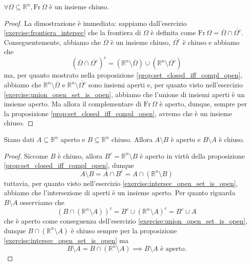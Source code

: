 \begin{lemma}
    $\forall \Omega \subseteq \mathbb{R}^n, \text{Fr} \, \Omega$ è un insieme chiuso.
    \label{lemma:frontiera_chiusa}
\end{lemma}
\begin{proof}
    La dimostrazione è immediata: sappiamo dall'esercizio \ref{exercise:frontiera_intersec} che la frontiera di $\Omega$ è definita come $\text{Fr} \, \Omega = \overline{\Omega} \cap \overline{\Omega^c}$. Conseguentemente,
    abbiamo che $\overline{\Omega}$ è un insieme chiuso, $\overline{\Omega^c}$ è chiuso e abbiamo che
    $$
        (\overline{\Omega} \cap \overline{\Omega^c})^c = (\mathbb{R}^n \setminus \overline{\Omega}) \cup (\mathbb{R}^n \setminus \overline{\Omega^c})
    $$
    ma, per quanto mostrato nella proposizione \ref{prop:set_closed_iff_compl_open}, abbiamo che $\mathbb{R}^n \setminus \overline{\Omega}$ e $\mathbb{R}^n \setminus \overline{\Omega^c}$ sono insiemi aperti e, per quanto visto nell'esercizio \ref{exercise:union_open_set_is_open}, abbiamo che
    l'unione di insiemi aperti è un insieme aperto. Ma allora il complementare di $\text{Fr} \, \Omega$ è aperto, dunque, sempre per la proposizione \ref{prop:set_closed_iff_compl_open}, avremo che è un insieme chiuso.
\end{proof}
\begin{lemma}
    Siano dati $A \subseteq \mathbb{R}^n$ aperto e $B \subseteq \mathbb{R}^n$ chiuso. Allora $A \setminus B$ è aperto e $B \setminus A$ è chiuso.
    \label{lemma:diff_open_closed_set}
\end{lemma}
\begin{proof}
    Siccome $B$ è chiuso, allora $B^c = \mathbb{R}^n \setminus B$ è aperto in virtù della proposizione \ref{prop:set_closed_iff_compl_open}, dunque 
    $$
    A \setminus B = A \cap B^c = A \cap (\mathbb{R}^n \setminus B)
    $$
    tuttavia, per quanto visto nell'esercizio \ref{exercise:intersec_open_set_is_open}, abbiamo che l'intersezione di aperti è un insieme aperto. Per quanto riguarda $B \setminus A$ osserviamo che
    $$
    (B \cap (\mathbb{R}^n \setminus A))^c = B^c \cup (\mathbb{R}^n \setminus A)^c = B^c \cup A
    $$
    che è aperto come conseguenza dell'esercizio \ref{exercise:union_open_set_is_open}, dunque $B \cap (\mathbb{R}^n \setminus A)$ è chiuso sempre per la proposizione \ref{exercise:intersec_open_set_is_open} ma
    $$
    B \setminus A = B \cap (\mathbb{R}^n \setminus A) \implies B \setminus A \text{ è aperto.}
    $$
\end{proof}
